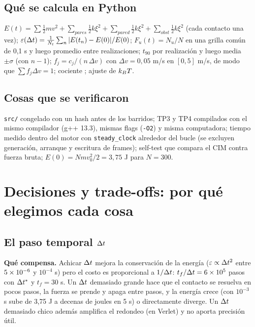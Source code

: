 \documentclass[10.5pt,a4paper]{article}
\begin{document}
\subsection{Qué se calcula en Python}
$E(t)=\sum\tfrac12mv^2+\sum_{pares}\tfrac12k\xi^2+\sum_{pared}\tfrac12k\xi^2+\sum_{obst}\tfrac12k\xi^2$ (cada contacto una vez); $\varepsilon(\Delta t)=\frac1{N_t}\sum_n|E(t_n)-E(0)|/E(0)$; $F_u(t)=N_u/N$ en una grilla común de 0,1 s y luego promedio entre realizaciones; $t_{90}$ por realización y luego media $\pm\sigma$ (con $n-1$); $f_j=c_j/(n\,\Delta v)$ con $\Delta v=0{,}05$ m/s en $[0,5]$ m/s, de modo que $\sum f_j\Delta v=1$; cociente \vv; ajuste de $k_BT$.


\subsection{Cosas que se verificaron}
\texttt{src/} congelado con un hash antes de los barridos; TP3 y TP4 compilados con el mismo compilador (g++ 13.3), mismas flags (\texttt{-O2}) y misma computadora; tiempo medido dentro del motor con \texttt{steady\_clock} alrededor del bucle (se excluyen generación, arranque y escritura de frames); self-test que compara el CIM contra fuerza bruta; $E(0)=Nmv_0^2/2=3{,}75$ J para $N=300$.

\section{Decisiones y trade-offs: por qué elegimos cada cosa}

\subsection{El paso temporal $\Delta t$}
\textbf{Qué compensa.} Achicar $\Delta t$ mejora la conservación de la energía ($\varepsilon\propto\Delta t^2$ entre $5\times10^{-6}$ y $10^{-4}$ s) pero el costo es proporcional a $1/\Delta t$: $t_f/\Delta t=6\times10^{5}$ pasos con $\Delta t^{*}$ y $t_f=30$ s. Un $\Delta t$ demasiado grande hace que el contacto se resuelva en pocos pasos, la fuerza se prende y apaga entre pasos, y la energía crece (con $10^{-3}$ s sube de 3,75 J a decenas de joules en 5 s) o directamente diverge. Un $\Delta t$ demasiado chico además amplifica el redondeo (en Verlet) y no aporta precisión útil.
\end{document}
